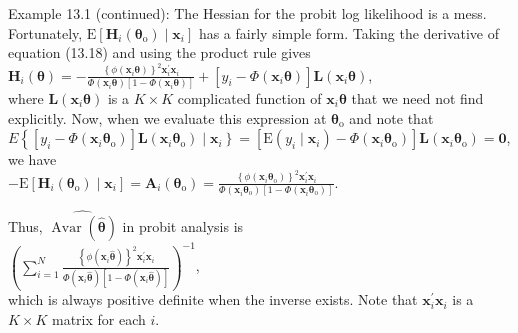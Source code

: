 \documentclass[10pt]{article}
\begin{document}
Example 13.1 (continued): The Hessian for the probit log likelihood is a mess. Fortunately, $\mathrm{E}\left[\mathbf{H}_{i}\left(\boldsymbol{\theta}_{\mathrm{o}}\right) \mid \mathbf{x}_{i}\right]$ has a fairly simple form. Taking the derivative of equation (13.18) and using the product rule gives\\
$\mathbf{H}_{i}(\boldsymbol{\theta})=-\frac{\left\{\phi\left(\mathbf{x}_{i} \boldsymbol{\theta}\right)\right\}^{2} \mathbf{x}_{i}^{\prime} \mathbf{x}_{i}}{\Phi\left(\mathbf{x}_{i} \boldsymbol{\theta}\right)\left[1-\Phi\left(\mathbf{x}_{i} \boldsymbol{\theta}\right)\right]}+\left[y_{i}-\Phi\left(\mathbf{x}_{i} \boldsymbol{\theta}\right)\right] \mathbf{L}\left(\mathbf{x}_{i} \boldsymbol{\theta}\right)$,\\
where $\mathbf{L}\left(\mathbf{x}_{i} \boldsymbol{\theta}\right)$ is a $K \times K$ complicated function of $\mathbf{x}_{i} \boldsymbol{\theta}$ that we need not find explicitly. Now, when we evaluate this expression at $\boldsymbol{\theta}_{\mathrm{o}}$ and note that $E\left\{\left[y_{i}-\Phi\left(\mathbf{x}_{i} \boldsymbol{\theta}_{\mathrm{o}}\right)\right] \mathbf{L}\left(\mathbf{x}_{i} \boldsymbol{\theta}_{\mathrm{o}}\right) \mid\right. \left.\mathbf{x}_{i}\right\}=\left[\mathrm{E}\left(y_{i} \mid \mathbf{x}_{i}\right)-\Phi\left(\mathbf{x}_{i} \boldsymbol{\theta}_{\mathrm{o}}\right)\right] \mathbf{L}\left(\mathbf{x}_{i} \boldsymbol{\theta}_{\mathrm{o}}\right)=\mathbf{0}$, we have\\
$-\mathrm{E}\left[\mathbf{H}_{i}\left(\boldsymbol{\theta}_{\mathrm{o}}\right) \mid \mathbf{x}_{i}\right]=\mathbf{A}_{i}\left(\boldsymbol{\theta}_{\mathrm{o}}\right)=\frac{\left\{\phi\left(\mathbf{x}_{i} \boldsymbol{\theta}_{\mathrm{o}}\right)\right\}^{2} \mathbf{x}_{i}^{\prime} \mathbf{x}_{i}}{\Phi\left(\mathbf{x}_{i} \boldsymbol{\theta}_{\mathrm{o}}\right)\left[1-\Phi\left(\mathbf{x}_{i} \boldsymbol{\theta}_{\mathrm{o}}\right)\right]}$.

Thus, $\widehat{\operatorname{Avar}(\hat{\boldsymbol{\theta}})}$ in probit analysis is\\
$\left(\sum_{i=1}^{N} \frac{\left\{\phi\left(\mathbf{x}_{i} \hat{\boldsymbol{\theta}}\right)\right\}^{2} \mathbf{x}_{i}^{\prime} \mathbf{x}_{i}}{\Phi\left(\mathbf{x}_{i} \hat{\boldsymbol{\theta}}\right)\left[1-\Phi\left(\mathbf{x}_{i} \hat{\boldsymbol{\theta}}\right)\right]}\right)^{-1}$,\\
which is always positive definite when the inverse exists. Note that $\mathbf{x}_{i}^{\prime} \mathbf{x}_{i}$ is a $K \times K$ matrix for each $i$.
\end{document}
